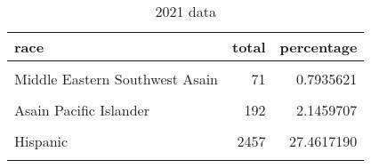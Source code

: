 \documentclass[
  letterpaper,
  DIV=11,
  numbers=noendperiod]{scrartcl}
\begin{document}
\newpage

\begin{table}

\caption{2021 data}
\centering
\begin{tabular}[t]{lrr}
\toprule
race & total & percentage\\
\midrule
\cellcolor{gray!6}{American Indian Alaskan Native} & \cellcolor{gray!6}{8} & \cellcolor{gray!6}{0.0894154}\\
Middle Eastern Southwest Asain & 71 & 0.7935621\\
\cellcolor{gray!6}{NA} & \cellcolor{gray!6}{83} & \cellcolor{gray!6}{0.9276853}\\
Asain Pacific Islander & 192 & 2.1459707\\
\cellcolor{gray!6}{White} & \cellcolor{gray!6}{732} & \cellcolor{gray!6}{8.1815134}\\
\addlinespace
Hispanic & 2457 & 27.4617190\\
\cellcolor{gray!6}{Black} & \cellcolor{gray!6}{5404} & \cellcolor{gray!6}{60.4001341}\\
\bottomrule
\end{tabular}
\end{table}
\end{document}
